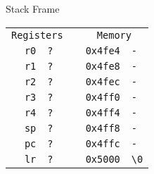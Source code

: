 



\begin{frame}{Stack Frame}
    \begin{alltt}
        \begin{tabular}{ r | l p{5mm} r | l }
            \multicolumn{2}{c}{Registers} && \multicolumn{2}{c}{Memory} \\
            r0 & ? && 0x4fe4 & - \\
            r1 & ? && 0x4fe8 & - \\
            r2 & ? && 0x4fec & - \\
            r3 & ? && 0x4ff0 & - \\
            r4 & ? && 0x4ff4 & - \\
            sp & ? && 0x4ff8 & - \\
            pc & ? && 0x4ffc & - \\
            lr & ? && 0x5000 & {\textbackslash}0 \\
            \end{tabular}
        \end{alltt}
    \end{frame}
